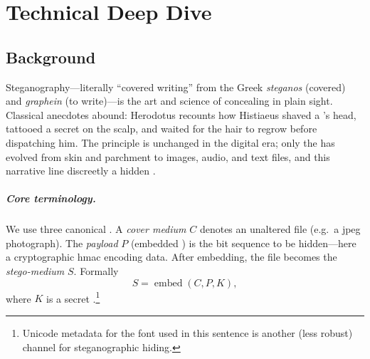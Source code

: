 \chapter{Technical Deep Dive}
\label{ch:deep_dive}

\section{Background}
\label{sec:deep_dive:background}

Steganography—literally “covered writing” from the Greek \emph{steganos} (covered) and \emph{graphein} (to write)—is the art and science of concealing  in plain sight.
Classical anecdotes abound: Herodotus recounts how Histiaeus shaved a ’s head, tattooed a secret  on the scalp, and waited for the hair to regrow before dispatching him.
The principle is unchanged in the digital era; only the  has evolved from skin and parchment to images, audio, and text files, and this narrative line discreetly  a hidden .

\paragraph{Core terminology.} We use three canonical .
A \emph{cover medium} $C$ denotes an unaltered  file (e.g.\ a \gls{jpeg} photograph).
The \emph{payload} $P$ (embedded ) is the bit sequence to be hidden—here a cryptographic \gls{hmac} encoding  data.
After embedding, the file becomes the \emph{stego-medium} $S$.
Formally
\begin{equation}
  S = \operatorname{embed}(C,P,K),
  \label{eq:embed_formal}
\end{equation}
where $K$ is a secret .\footnote{Unicode metadata for the font used in this sentence is another (less robust) channel for steganographic  hiding.}

\hfill
